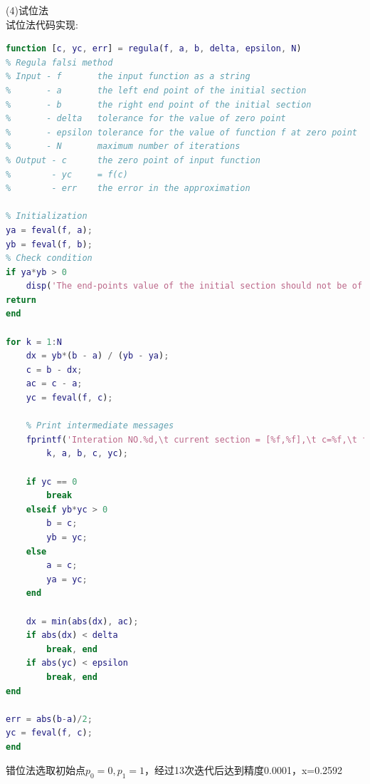 \documentclass[UTF8]{ctexart}
\begin{document}
(4)试位法\\
试位法代码实现:
\begin{lstlisting}[language=matlab]
function [c, yc, err] = regula(f, a, b, delta, epsilon, N)
% Regula falsi method
% Input - f       the input function as a string
%       - a       the left end point of the initial section
%       - b       the right end point of the initial section
%       - delta   tolerance for the value of zero point
%       - epsilon tolerance for the value of function f at zero point
%       - N       maximum number of iterations
% Output - c      the zero point of input function
%        - yc     = f(c)
%        - err    the error in the approximation

% Initialization
ya = feval(f, a);
yb = feval(f, b);
% Check condition
if ya*yb > 0
	disp('The end-points value of the initial section should not be of the same sign');
return
end

for k = 1:N
	dx = yb*(b - a) / (yb - ya);
	c = b - dx;
	ac = c - a;
	yc = feval(f, c);

	% Print intermediate messages
	fprintf('Interation NO.%d,\t current section = [%f,%f],\t c=%f,\t f(c)=%f\n',...
		k, a, b, c, yc);

	if yc == 0
		break
	elseif yb*yc > 0
		b = c;
		yb = yc;
	else
		a = c;
		ya = yc;
	end

	dx = min(abs(dx), ac);
	if abs(dx) < delta
		break, end
	if abs(yc) < epsilon
		break, end
end

err = abs(b-a)/2;
yc = feval(f, c);
end
\end{lstlisting}
错位法选取初始点$p_0=0,p_1=1$，经过13次迭代后达到精度0.0001，x=0.2592
\end{document}
